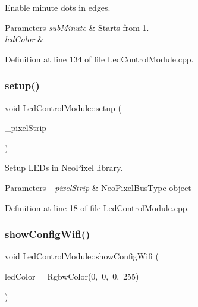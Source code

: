 Enable minute dots in edges. 
\begin{DoxyParams}{Parameters}
{\em sub\+Minute} & Starts from 1. \\
\hline
{\em led\+Color} & \\
\hline
\end{DoxyParams}


Definition at line 134 of file Led\+Control\+Module.\+cpp.

\mbox{\label{class_led_control_module_ae1eb70e65006f55b30f6a034706829b5}} 
\subsubsection{\texorpdfstring{setup()}{setup()}}
{\footnotesize\ttfamily void Led\+Control\+Module\+::setup (\begin{DoxyParamCaption}\item[{\mbox{\hyperlink{_led_control_module_8h_a51a7b766d62733fca1ec20e82e024f9f}{Neo\+Pixel\+Bus\+Type}} $\ast$}]{\+\_\+pixel\+Strip }\end{DoxyParamCaption})}

Setup L\+E\+Ds in Neo\+Pixel library. 
\begin{DoxyParams}{Parameters}
{\em \+\_\+pixel\+Strip} & Neo\+Pixel\+Bus\+Type object \\
\hline
\end{DoxyParams}


Definition at line 18 of file Led\+Control\+Module.\+cpp.

\mbox{\label{class_led_control_module_a70c42e2f9baee807bfdb9fe9bd2f6d8e}} 
\subsubsection{\texorpdfstring{showConfigWifi()}{showConfigWifi()}}
{\footnotesize\ttfamily void Led\+Control\+Module\+::show\+Config\+Wifi (\begin{DoxyParamCaption}\item[{const Rgbw\+Color \&}]{led\+Color = {\ttfamily RgbwColor(0,~0,~0,~255)} }\end{DoxyParamCaption})}

